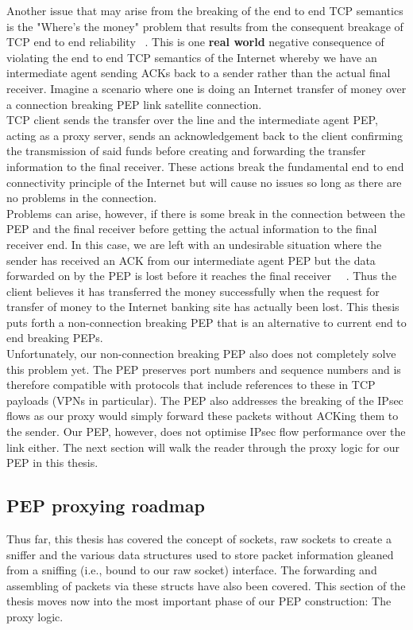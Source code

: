 Another issue that may arise from the breaking of the end to end TCP semantics is the "Where's the money" problem that results from the consequent breakage of TCP end to end reliability ~\cite{13}. This is one \textbf{real world} negative consequence of violating the end to end TCP semantics of the Internet whereby we have an intermediate agent sending ACKs back to a sender rather than the actual final receiver. Imagine a scenario where one is doing an Internet transfer of money over a connection breaking PEP link satellite connection. \\

TCP client sends the transfer over the line and the intermediate agent PEP, acting as a proxy server, sends an acknowledgement back to the client confirming the transmission of said funds before creating and forwarding the transfer information to the final receiver. These actions break the fundamental end to end connectivity principle of the Internet but will cause no issues so long as there are no problems in the connection. \\

Problems can arise, however, if there is some break in the connection between the PEP and the final receiver before getting the actual information to the final receiver end. In this case, we are left with an undesirable situation where the sender has received an ACK from our intermediate agent PEP but the data forwarded on by the PEP is lost before it reaches the final receiver ~\cite{13}~\cite{14}. Thus the client believes it has transferred the money successfully when the request for transfer of money to the Internet banking site has actually been lost. This thesis puts forth a non-connection breaking PEP that is an alternative to current end to end breaking PEPs. \\

Unfortunately, our non-connection breaking PEP also does not completely solve this problem yet. The PEP preserves port numbers and sequence numbers and is therefore compatible with protocols that include references to these in TCP payloads (VPNs in particular). The PEP also addresses the breaking of the IPsec flows as our proxy would simply forward these packets without ACKing them to the sender. Our PEP, however, does not optimise IPsec flow performance over the link either. The next section will walk the reader through the proxy logic for our PEP in this thesis.

\subsection{PEP proxying roadmap}
Thus far, this thesis has covered the concept of sockets, raw sockets to create a sniffer and the various data structures used to store packet information gleaned from a sniffing (i.e., bound to our raw socket) interface. The forwarding and assembling of packets via these structs have also been covered. This section of the thesis moves now into the most important phase of our PEP construction: The proxy logic.\\

